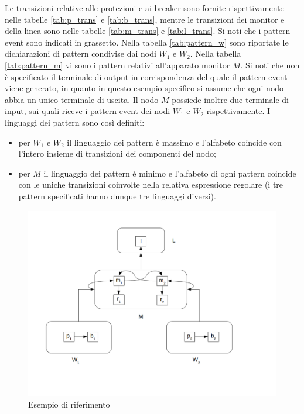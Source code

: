 \begin{ex}
Le transizioni relative alle protezioni e ai breaker sono fornite rispettivamente nelle tabelle \ref{tab:p_trans} e \ref{tab:b_trans}, mentre le transizioni dei monitor e della linea sono nelle tabelle \ref{tab:m_trans} e \ref{tab:l_trans}. Si noti che i pattern event sono indicati in grassetto.
Nella tabella \ref{tab:pattern_w} sono riportate le dichiarazioni di pattern condivise dai nodi $W_1$ e $W_2$. 
Nella tabella \ref{tab:pattern_m} vi sono i pattern relativi all'apparato monitor $M$.
Si noti che non è specificato il terminale di output in corrispondenza del quale il pattern event viene generato, in quanto in questo esempio specifico si assume che ogni nodo abbia un unico terminale di uscita. Il nodo $M$ possiede inoltre due terminale di input, sui quali riceve i pattern event dei nodi $W_1$ e $W_2$ rispettivamente.
I linguaggi dei pattern sono così definiti:
\begin{itemize}
\item per $W_1$ e $W_2$ il linguaggio dei pattern è massimo e l'alfabeto coincide con l'intero insieme di transizioni dei componenti del nodo;
\item per $M$ il linguaggio dei pattern è minimo e l'alfabeto di ogni pattern coincide con le uniche transizioni coinvolte nella relativa espressione regolare (i tre pattern specificati hanno dunque tre linguaggi diversi).
\end{itemize}
\end{ex}

\begin{figure}[htbp]
\centering
\includegraphics[scale=0.4]{./Img/sac/sac.png}
\caption{Esempio di riferimento}
\label{fig:sac}
\end{figure}

